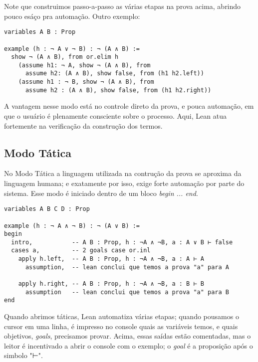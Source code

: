 \noindent Note que construimos passo-a-passo as várias etapas na prova acima, abrindo pouco esáço pra automação. Outro exemplo:

\vspace{5mm}
\begin{lstlisting}
variables A B : Prop

example (h : ¬ A ∨ ¬ B) : ¬ (A ∧ B) :=
  show ¬ (A ∧ B), from or.elim h
    (assume h1: ¬ A, show ¬ (A ∧ B), from
      assume h2: (A ∧ B), show false, from (h1 h2.left))
    (assume h1 : ¬ B, show ¬ (A ∧ B), from
      assume h2 : (A ∧ B), show false, from (h1 h2.right))
\end{lstlisting}
\vspace{5mm}

\noindent A vantagem nesse modo está no controle direto da prova, e pouca automação, em que o usuário é plenamente consciente sobre o processo. Aqui, Lean atua fortemente na verificação da construção dos termos.

\subsection{Modo Tática}
No Modo Tática a linguagem utilizada na contrução da prova se aproxima da linguagem humana; e exatamente por isso, exige forte automação por parte do sistema. Esse modo é iniciado dentro de um bloco \textit{begin ... end}.

\vspace{5mm}
\begin{lstlisting}
variables A B C D : Prop

example (h : ¬ A ∧ ¬ B) : ¬ (A ∨ B) :=
begin
  intro,           -- A B : Prop, h : ¬A ∧ ¬B, a : A ∨ B ⊢ false
  cases a,         -- 2 goals case or.inl
    apply h.left,  -- A B : Prop, h : ¬A ∧ ¬B, a : A ⊢ A
      assumption,  -- lean conclui que temos a prova "a" para A

    apply h.right, -- A B : Prop, h : ¬A ∧ ¬B, a : B ⊢ B
      assumption   -- lean conclui que temos a prova "a" para B
end
\end{lstlisting}
\vspace{5mm}

Quando abrimos táticas, Lean automatiza várias etapas; quando pousamos o cursor em uma linha, é impresso no console quais as variáveis temos, e quais objetivos, \textit{goals}, precisamos provar. Acima, essas saídas estão comentadas, mas o leitor é incentivado a abrir o console com o exemplo; o \textit{goal} é a proposição após o simbolo "⊢".

